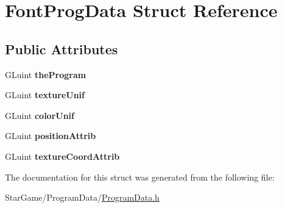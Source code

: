 \hypertarget{struct_font_prog_data}{\section{Font\-Prog\-Data Struct Reference}
\label{struct_font_prog_data}
}
\subsection*{Public Attributes}
\begin{DoxyCompactItemize}
\item 
\hypertarget{struct_font_prog_data_ad765055eacc8ccfea6ea7c6608c30a3e}{G\-Luint {\bfseries the\-Program}}\label{struct_font_prog_data_ad765055eacc8ccfea6ea7c6608c30a3e}

\item 
\hypertarget{struct_font_prog_data_aab4745bb8474fee1b7c2a3d1a152402a}{G\-Luint {\bfseries texture\-Unif}}\label{struct_font_prog_data_aab4745bb8474fee1b7c2a3d1a152402a}

\item 
\hypertarget{struct_font_prog_data_a84ef69bd9404b5c40d4f111cdcdbeca8}{G\-Luint {\bfseries color\-Unif}}\label{struct_font_prog_data_a84ef69bd9404b5c40d4f111cdcdbeca8}

\item 
\hypertarget{struct_font_prog_data_ab710001be0b5dbd46f9f84e2e36ab889}{G\-Luint {\bfseries position\-Attrib}}\label{struct_font_prog_data_ab710001be0b5dbd46f9f84e2e36ab889}

\item 
\hypertarget{struct_font_prog_data_a9133118f0ecc96271e8ec7ea7715db4d}{G\-Luint {\bfseries texture\-Coord\-Attrib}}\label{struct_font_prog_data_a9133118f0ecc96271e8ec7ea7715db4d}

\end{DoxyCompactItemize}


The documentation for this struct was generated from the following file\-:\begin{DoxyCompactItemize}
\item 
Star\-Game/\-Program\-Data/\hyperlink{_program_data_8h}{Program\-Data.\-h}\end{DoxyCompactItemize}
